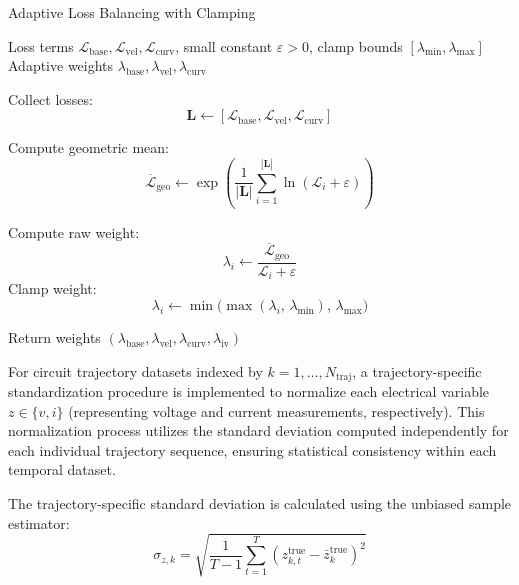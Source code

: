 \documentclass[11pt, oneside]{article}
\begin{document}
\begin{algorithm}[H]
    \caption{Adaptive Loss Balancing with Clamping}
    \label{alg:adaptive_loss_balancing}
    \begin{algorithmic}[1]
        \Require Loss terms \(\mathcal{L}_{\text{base}}, \mathcal{L}_{\text{vel}}, \mathcal{L}_{\text{curv}}\), small constant \(\varepsilon > 0\), clamp bounds \([\lambda_{\min}, \lambda_{\max}]\)
        \Ensure Adaptive weights \(\lambda_{\text{base}}, \lambda_{\text{vel}}, \lambda_{\text{curv}}\)
        \Statex

        \State Collect losses:
        \[
            \mathbf{L} \gets [\mathcal{L}_{\text{base}}, \mathcal{L}_{\text{vel}}, \mathcal{L}_{\text{curv}}]
        \]

        \State Compute geometric mean:
        \[
            \overline{\mathcal{L}}_{\text{geo}} \gets \exp\!\left(\frac{1}{|\mathbf{L}|} \sum_{i=1}^{|\mathbf{L}|} \ln(\mathcal{L}_i + \varepsilon)\right)
        \]

        \State Compute raw weight:
        \[
            \lambda_i \gets \frac{\overline{\mathcal{L}}_{\text{geo}}}{\mathcal{L}_i + \varepsilon}
        \]
        \State Clamp weight:
        \[
            \lambda_i \gets \min\!\big(\max(\lambda_i, \, \lambda_{\min}), \, \lambda_{\max}\big)
        \]
        \EndFor

        \State Return weights \((\lambda_{\text{base}}, \lambda_{\text{vel}}, \lambda_{\text{curv}}, \lambda_{\text{iv}})\)
    \end{algorithmic}
\end{algorithm}


For circuit trajectory datasets indexed by \(k = 1, \ldots, N_{\text{traj}}\), a trajectory-specific standardization procedure is implemented to normalize each electrical variable \(z \in \{v, i\}\) (representing voltage and current measurements, respectively). This normalization process utilizes the standard deviation computed independently for each individual trajectory sequence, ensuring statistical consistency within each temporal dataset.

The trajectory-specific standard deviation is calculated using the unbiased sample estimator:
\begin{equation}
    \sigma_{z,k} = \sqrt{\frac{1}{T-1} \sum_{t=1}^{T} \left(z_{k,t}^{\mathrm{true}} - \bar{z}_k^{\mathrm{true}}\right)^2}
\end{equation}
\end{document}
